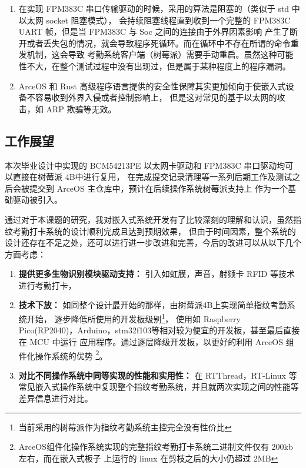 \begin{enumerate}
        \item 在实现 FPM383C 串口传输驱动的时候，采用的算法是阻塞的（类似于 std 中以太网 socket 阻塞模式），
            会持续阻塞线程直到收到一个完整的 FPM383C UART 帧，但是当 FPM383C 与 Soc 之间的连接由于外界因素影响
            产生了断开或者丢失包的情况，就会导致程序死循环。而在循环中不存在所谓的命令重发机制，这会导致
            考勤系统客户端（树莓派）需要手动重启。虽然这种可能性不大，在整个测试过程中没有出现过，但是属于某种程度上的程序漏洞。
        
        \item ArceOS 和 Rust 高级程序语言提供的安全性保障其实更加倾向于使嵌入式设备不容易收到外界入侵或者控制影响上，
            但是这对常见的基于以太网的攻击，如 ARP 欺骗等无效。
    \end{enumerate}

    \subsection{工作展望}

    本次毕业设计中实现的 BCM54213PE 以太网卡驱动和 FPM383C 串口驱动均可以直接在树莓派 4B中进行复用，
    在完成提交记录清理等一系列后期工作及测试之后会被提交到 ArceOS 主仓库中，预计在后续操作系统树莓派支持上
    作为一个基础驱动被引入。

    通过对于本课题的研究，我对嵌入式系统开发有了比较深刻的理解和认识，虽然指纹考勤打卡系统的设计顺利完成且达到预期效果，
    但由于时间因素，整个系统的设计还存在不足之处，还可以进行进一步改进和完善，今后的改进可以从以下几个方面考虑：

    \begin{enumerate}
        \item \textbf{提供更多生物识别模块驱动支持：} 引入如虹膜，声音，射频卡 RFID 等技术进行考勤打卡，
        \item \textbf{技术下放：} 如同整个设计最开始的那样，由树莓派4B上实现简单指纹考勤系统开始，
        逐步降低所使用的开发板级别\footnote{当前采用的树莓派作为指纹考勤系统主控完全没有性价比}，
        使用如 Raspberry Pico(RP2040)，Arduino，stm32f103等相对较为便宜的开发板，甚至最后直接在 MCU 中运行
        应用程序。通过逐层降级开发板，以更好的利用 ArceOS 组件化操作系统的优势
        \footnote{ArceOS组件化操作系统实现的完整指纹考勤打卡系统二进制文件仅有 200kb 左右，而在嵌入式板子
        上运行的 linux 在剪枝之后的大小仍超过 2MB}。
        \item \textbf{对比不同操作系统中同等实现的性能和实用性：}
        在 RTThread，RT-Linux 等常见嵌入式操作系统中复现整个指纹考勤系统，并且就两次实现之间的性能等差异信息进行对比。
        
    \end{enumerate}